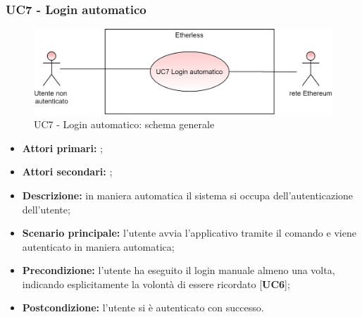 \subsubsection{UC7 - Login automatico}
\begin{figure}[H]
	\centering
	\includegraphics[scale=\ucs]{./res/img/UC7G.png}
	\caption {UC7 - Login automatico: schema generale}
\end{figure}
\begin{itemize}
	\item \textbf{Attori primari:} \una{};
	\item \textbf{Attori secondari:} \re{};
	\item \textbf{Descrizione:} in maniera automatica il sistema si occupa dell’autenticazione dell’utente;
	\item \textbf{Scenario principale:} l’utente avvia l'applicativo tramite il comando \init{} e viene autenticato in maniera automatica; 
	\item \textbf{Precondizione:} l’utente ha eseguito il login manuale almeno una volta, indicando esplicitamente la volontà di essere ricordato [\textbf{UC6}];
	\item \textbf{Postcondizione:} l’utente si è autenticato con successo.
\end{itemize}